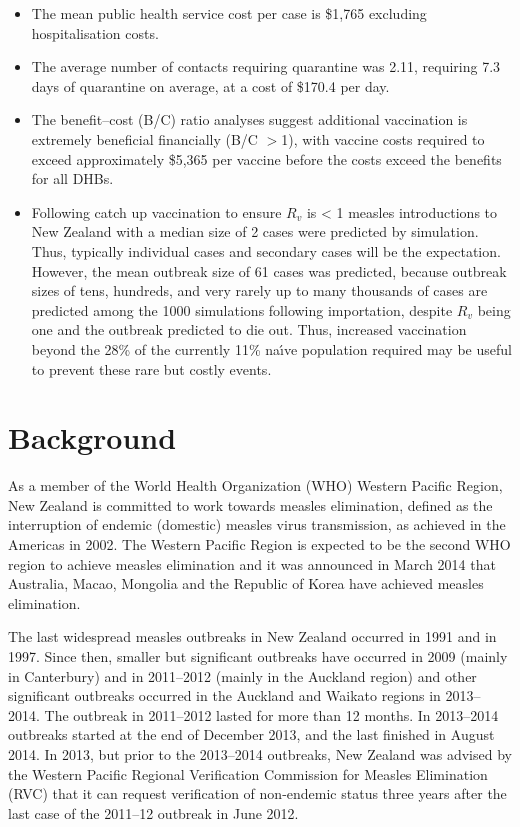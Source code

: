 \documentclass{article}
\begin{document}
\begin{itemize}
\item The mean public health service cost per case is \$1,765 excluding hospitalisation costs.
\item The average number of contacts requiring quarantine was 2.11, requiring 7.3 days of quarantine on average, at a cost of \$170.4 per day.
\item The benefit--cost (B/C) ratio analyses suggest additional vaccination is extremely beneficial financially (B/C $>$1), with vaccine costs required to exceed approximately \$5,365 per vaccine before the costs exceed the benefits for all DHBs.
\item Following catch up vaccination to ensure $R_v$ is < 1 measles introductions to New Zealand with a median size of 2 cases were predicted by simulation. Thus, typically individual cases and secondary cases will be the expectation. However, the mean outbreak size of 61 cases was predicted, because outbreak sizes of tens, hundreds, and very rarely up to many thousands of cases are predicted among the 1000 simulations following importation, despite $R_v$ being one and the outbreak predicted to die out. Thus, increased vaccination beyond the 28\% of the currently 11\% na\'{\i}ve population required may be useful to prevent these rare but costly events.
\end{itemize}

\section{Background}

As a member of the World Health Organization (WHO) Western Pacific Region, New Zealand is committed to work towards measles elimination, defined as the interruption of endemic (domestic) measles virus transmission, as achieved in the Americas in 2002. The Western Pacific Region is expected to be the second WHO region to  achieve measles elimination and it was announced in March 2014 that Australia, Macao, Mongolia and the Republic of Korea have achieved measles elimination.

The last widespread measles outbreaks in New Zealand occurred in 1991 and in 1997. Since then, smaller but significant outbreaks have occurred in 2009 (mainly in Canterbury) and in 2011--2012 (mainly in the Auckland region) and other significant outbreaks occurred in the Auckland and Waikato regions in 2013--2014. The outbreak in 2011--2012 lasted for more than 12 months. In 2013--2014 outbreaks started at the end of December 2013, and the last finished in August 2014. In 2013, but prior to the 2013--2014 outbreaks, New Zealand was advised by the Western Pacific Regional Verification Commission for Measles Elimination (RVC) that it can request verification of non-endemic status three years after the last case of the 2011--12 outbreak in June 2012.
\end{document}
